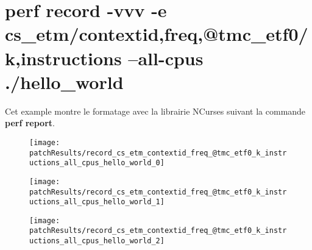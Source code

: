 

\newpage
\section*{perf record -vvv -e cs\_etm/contextid,freq,@tmc\_etf0/k,instructions --all-cpus ./hello\_world}
Cet example montre le formatage avec la librairie NCurses suivant la commande
\textbf{perf report}.

\begin{figure}[H]
	\begin{center}
		\texttt{[image: \\patchResults/record\_cs\_etm\_contextid\_freq\_@tmc\_etf0\_k\_instructions\_all\_cpus\_hello\_world\_0]}
	\end{center}
\end{figure}

\begin{figure}[H]
	\begin{center}
		\texttt{[image: \\patchResults/record\_cs\_etm\_contextid\_freq\_@tmc\_etf0\_k\_instructions\_all\_cpus\_hello\_world\_1]}
	\end{center}
\end{figure}

\begin{figure}[H]
	\begin{center}
		\texttt{[image: \\patchResults/record\_cs\_etm\_contextid\_freq\_@tmc\_etf0\_k\_instructions\_all\_cpus\_hello\_world\_2]}
	\end{center}
\end{figure}



